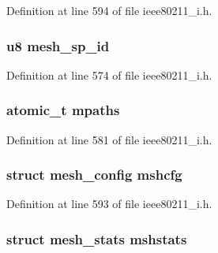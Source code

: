 Definition at line 594 of file ieee80211\-\_\-i.\-h.

\hypertarget{structieee80211__if__mesh_a082033acd11ca0e290b5d58e588129dc}{
\subsubsection[{mesh\-\_\-sp\-\_\-id}]{\setlength{\rightskip}{0pt plus 5cm}u8 mesh\-\_\-sp\-\_\-id}}\label{structieee80211__if__mesh_a082033acd11ca0e290b5d58e588129dc}


Definition at line 574 of file ieee80211\-\_\-i.\-h.

\hypertarget{structieee80211__if__mesh_a682324aeb04ad3c555c56e5cb52e53c5}{
\subsubsection[{mpaths}]{\setlength{\rightskip}{0pt plus 5cm}atomic\-\_\-t mpaths}}\label{structieee80211__if__mesh_a682324aeb04ad3c555c56e5cb52e53c5}


Definition at line 581 of file ieee80211\-\_\-i.\-h.

\hypertarget{structieee80211__if__mesh_a7b25051eee4817560f5bcb80402751f5}{
\subsubsection[{mshcfg}]{\setlength{\rightskip}{0pt plus 5cm}struct mesh\-\_\-config mshcfg}}\label{structieee80211__if__mesh_a7b25051eee4817560f5bcb80402751f5}


Definition at line 593 of file ieee80211\-\_\-i.\-h.

\hypertarget{structieee80211__if__mesh_a63aef80a54bf42d120b10d0b637b57be}{
\subsubsection[{mshstats}]{\setlength{\rightskip}{0pt plus 5cm}struct {\bf mesh\-\_\-stats} mshstats}}\label{structieee80211__if__mesh_a63aef80a54bf42d120b10d0b637b57be}


